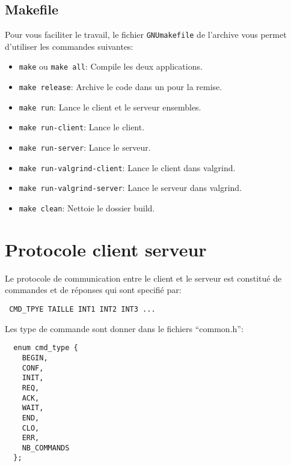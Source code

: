 \documentclass{article}
\begin{document}
\subsection{Makefile}

Pour vous faciliter le travail, le fichier \texttt{GNUmakefile} de l'archive
vous permet d'utiliser les commandes suivantes:
\begin{itemize}
  \item \texttt{make} ou \texttt{make all}: Compile les deux applications.
  \item \texttt{make release}: Archive le code dans un  pour la remise.
  \item \texttt{make run}: Lance le client et le serveur ensembles.
  \item \texttt{make run-client}: Lance le client.
  \item \texttt{make run-server}: Lance le serveur.
  \item \texttt{make run-valgrind-client}: Lance le client dans valgrind.
  \item \texttt{make run-valgrind-server}: Lance le serveur dans valgrind.
  \item \texttt{make clean}: Nettoie le dossier build.
\end{itemize}

\section{Protocole client serveur}
Le protocole de communication entre le client et le serveur est constitué de
commandes et de réponses qui sont specifié par:

\vspace{0.3cm}
\texttt{ CMD\_TPYE TAILLE INT1 INT2 INT3 ...}
\vspace{0.3cm}

\noindent
Les type de commande sont donner dans le fichiers ``common.h'':

\begin{verbatim}
  enum cmd_type {
    BEGIN,
    CONF,
    INIT,
    REQ,
    ACK,
    WAIT,
    END,
    CLO,
    ERR,
    NB_COMMANDS
  };
\end{verbatim}
\end{document}
